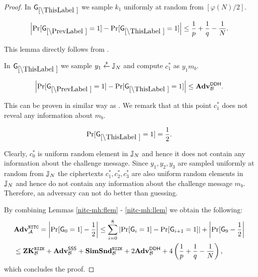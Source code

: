 \begin{proof}
%
%
%

In $\games_\thisgame$ we sample $k_1$ uniformly at random from $[\varphi(N)/2]$. 

\begin{lemma}
\[
\left|\Pr[\games_\prevgame = 1] - \Pr[\games_\thisgame = 1]\right| \leq \frac{1}{p}+\frac{1}{q}-\frac{1}{N}.
\]
\end{lemma}

This lemma directly follows from .

In $\games_\thisgame$ we sample $y_1 \stackrel{{\scriptscriptstyle\$}}{\leftarrow} \mathbb{J}_N$ and compute $c_1^*$ as  $y_1 m_b$. 

\begin{lemma}
\[
\left|\Pr[\games_\prevgame = 1] - \Pr[\games_\thisgame = 1]\right| \leq \advtg_\advB^\ddh.
\]
\end{lemma}
This can be proven in similar way as . We remark that at this point $c_1^*$ does not reveal any information about $m_b$.

\begin{lemma}\label{nitc-mh:llem}
\[
\Pr[\games_\thisgame = 1] = \half.
\]
\end{lemma}

Clearly, $c_0^*$ is uniform random element in $\mathbb{J}_N$ and hence it does not contain any information about the challenge message. Since $y_1, y_2, y_3$ are sampled uniformly at random from $\mathbb{J}_N$ the ciphertexts $c_1^*, c_2^*, c_3^*$ are also uniform random elements in $\mathbb{J}_N$ and hence do not contain any information about the challenge message $m_b$. Therefore, an adversary can not do better than guessing.

By combining Lemmas \ref{nitc-mh:flem} - \ref{nitc-mh:llem} we obtain the following:
\begin{align*}
&\mathbf{Adv}^{\mathtt{NITC}}_{\mathcal{A}} = \left| \Pr[\mathsf{G}_0 = 1] - \frac{1}{2} \right| \leq \sum_{i=0}^8 \left|\Pr[\mathsf{G}_i = 1] - \Pr[\mathsf{G}_{i+1} = 1] \right| + \left|\Pr[\mathsf{G}_{9}- \frac{1}{2}\right| \\
 &\leq \mathbf{ZK}^{\mathtt{NIZK}}_{\mathcal{B}} + \mathbf{Adv}^{\mathsf{SSS}}_{\mathcal{B}} + \mathbf{SimSnd}^{\mathtt{NIZK}}_{\mathcal{B}} + 2 \mathbf{Adv}^{\mathsf{DDH}}_{\mathcal{B}} + 4 \left( \frac{1}{p}+\frac{1}{q}-\frac{1}{N} \right),
\end{align*}
which concludes the proof.
\end{proof}

